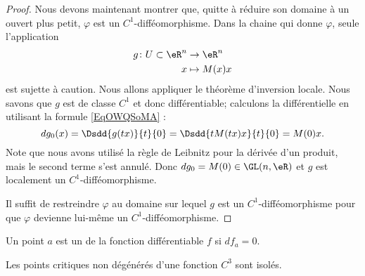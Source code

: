 \begin{proof}
	Nous devons maintenant montrer que, quitte à réduire son domaine à un ouvert plus petit, \( \varphi\) est un \( C^1\)-difféomorphisme. Dans la chaine qui donne \( \varphi\), seule l'application
	\begin{equation}
		\begin{aligned}
			g\colon U\subset \eR^n & \to \eR^n     \\
			x                      & \mapsto M(x)x
		\end{aligned}
	\end{equation}
	est sujette à caution. Nous allons appliquer le théorème d'inversion locale. Nous savons que \( g\) est de classe \( C^1\) et donc différentiable; calculons la différentielle en utilisant la formule \eqref{EqOWQSoMA} :
	\begin{equation}
		dg_0(x)=\Dsdd{ g(tx) }{t}{0}=\Dsdd{ tM(tx)x }{t}{0}=M(0)x.
	\end{equation}
	Note que nous avons utilisé la règle de Leibnitz pour la dérivée d'un produit, mais le second terme s'est annulé. Donc \( dg_0=M(0)\in \GL(n,\eR)\) et \( g\) est localement un \( C^1\)-difféomorphisme.

	Il suffit de restreindre \( \varphi\) au domaine sur lequel \( g\) est un \( C^1\)-difféomorphisme pour que \( \varphi\) devienne lui-même un \( C^1\)-difféomorphisme.

\end{proof}

\begin{definition}
	Un point \( a\) est un  de la fonction différentiable \( f\) si \( df_a=0\).
\end{definition}

\begin{corollary}
	Les points critiques non dégénérés d'une fonction \( C^3\) sont isolés.
\end{corollary}

